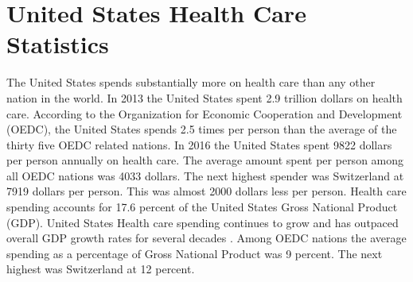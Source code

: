 \documentclass[sigconf]{acmart}
\begin{document}
\section{United States Health Care Statistics}
The United States spends substantially more on health care than any other nation in the world.  In 2013 the United States spent 2.9 trillion dollars on health care.  According to the Organization for Economic Cooperation and Development (OEDC), the United States spends 2.5 times per person than the average of the thirty five OEDC related nations.  In 2016 the United States spent 9822 dollars per person annually on health care. The average amount spent per person among all OEDC nations was 4033 dollars.  The next highest spender was Switzerland at 7919 dollars per person. This was almost 2000 dollars less per person.  Health care spending accounts for 17.6 percent of the United States Gross National Product (GDP). United States Health care spending continues to grow and has outpaced overall GDP growth rates for several decades \cite{www-google-McDonald}. Among OEDC nations the average spending as a percentage of Gross National Product was 9 percent. The next highest was Switzerland at 12 percent. 
\end{document}
